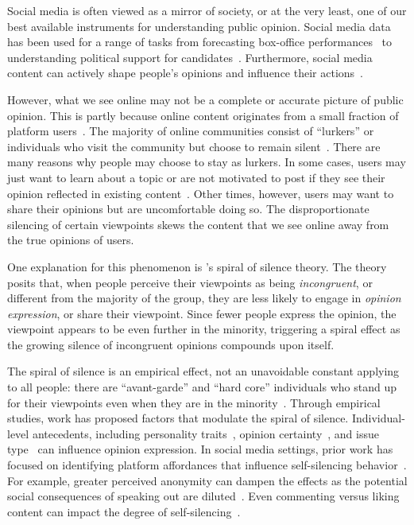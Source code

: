 Social media is often viewed as a mirror of society, or at the very least, one of our best available instruments for understanding public opinion. Social media data has been used for a range of tasks from forecasting box-office performances~\cite{asur2010predicting} to understanding political support for candidates~\cite{mcgregor2020taking}. Furthermore, social media content can actively shape people's opinions and influence their actions~\cite{laranjo2015influence}.


However, what we see online may not be a complete or accurate picture of public opinion. This is partly because online content originates from a small fraction of platform users~\cite{ruths2014social}. The majority of online communities consist of ``lurkers'' or individuals who visit the community but choose to remain silent~\cite{sun2014understanding}. There are many reasons why people may choose to stay as lurkers. In some cases, users may just want to learn about a topic or are not motivated to post if they see their opinion reflected in existing content~\cite{nonnecke2001lurkers}. Other times, however, users may want to share their opinions but are uncomfortable doing so. The disproportionate silencing of certain viewpoints skews the content that we see online away from the true opinions of users.  

One explanation for this phenomenon is \citet{noelle1974spiral}'s spiral of silence theory. The theory posits that, when people perceive their viewpoints as being \textit{incongruent}, or different from the majority of the group, they are less likely to engage in \textit{opinion expression}, or share their viewpoint. Since fewer people express the opinion, the viewpoint appears to be even further in the minority, triggering a spiral effect as the growing silence of incongruent opinions compounds upon itself. 


The spiral of silence is an empirical effect, not an unavoidable constant applying to all people: there are ``avant-garde'' and ``hard core'' individuals who stand up for their viewpoints even when they are in the minority~\cite{noelle1977turbulences}. Through empirical studies,  work has proposed factors that modulate the spiral of silence. Individual-level antecedents, including personality traits~\cite{hayes2005willingness,neuwirth2007spiral}, opinion certainty~\cite{matthes2018spiral}, and issue type~\cite{gearhart2018same} can influence opinion expression. In social media settings, prior work has focused on identifying platform affordances that influence self-silencing behavior~\cite{wu2018comment,pang2016can}. For example, greater perceived anonymity can dampen the effects as the potential social consequences of speaking out are diluted~\cite{wu2018comment}. Even commenting versus liking content can impact the degree of self-silencing~\cite{pang2016can}. 
 
